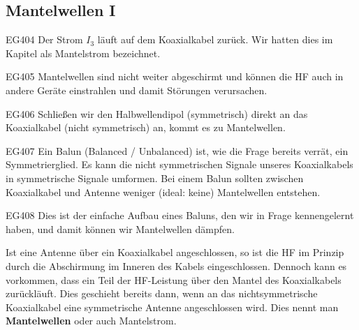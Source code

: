 \subsection{Mantelwellen I}

\begin{sol}{EG404}
 Der Strom $I_3$ läuft auf dem Koaxialkabel zurück. Wir hatten dies im Kapitel als Mantelstrom bezeichnet.
\end{sol}

\begin{sol}{EG405}
Mantelwellen sind nicht weiter abgeschirmt und können die HF auch in andere Geräte einstrahlen und damit Störungen verursachen.
\end{sol}

\begin{sol}{EG406}
Schließen wir den Halbwellendipol (symmetrisch) direkt an das Koaxialkabel (nicht symmetrisch) an, kommt es zu Mantelwellen.
\end{sol}

\begin{sol}{EG407}
Ein Balun (Balanced / Unbalanced) ist, wie die Frage bereits verrät, ein Symmetrierglied. Es kann die nicht symmetrischen Signale unseres Koaxialkabels in symmetrische Signale umformen. Bei einem Balun sollten zwischen Koaxialkabel und Antenne weniger (ideal: keine) Mantelwellen entstehen.
\end{sol}

\begin{sol}{EG408}
    Dies ist der einfache Aufbau eines Baluns, den wir in Frage  kennengelernt haben, und damit können wir Mantelwellen dämpfen.
\end{sol}

\begin{ohmchapter}

    Ist eine Antenne über ein Koaxialkabel angeschlossen, so ist die HF im Prinzip durch die Abschirmung im Inneren des Kabels eingeschlossen.
    Dennoch kann es vorkommen, dass ein Teil der HF-Leistung über den Mantel des Koaxialkabels zurückläuft. Dies geschieht bereits dann, wenn an das nichtsymmetrische Koaxialkabel eine symmetrische Antenne angeschlossen wird. Dies nennt man \textbf{Mantelwellen} oder auch Mantelstrom.

\end{ohmchapter}